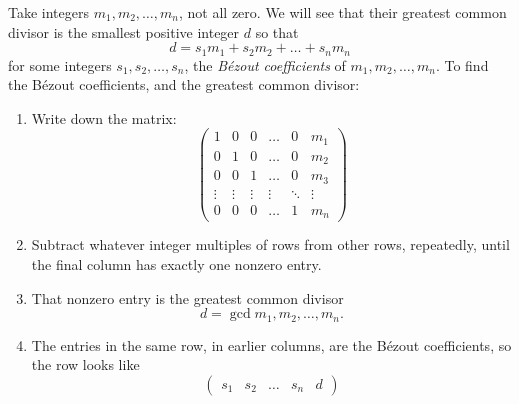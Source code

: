 Take integers \(m_1, m_2, \dots, m_n\), not all zero.
We will see that their greatest common divisor is the smallest positive integer \(d\) so that
\[
d = s_1 m_1 + s_2 m_2 + \dots + s_n m_n
\]
for some integers \(s_1, s_2, \dots, s_n\), the \emph{B\'ezout coefficients} of \(m_1, m_2, \dots, m_n\).
To find the B\'ezout coefficients, and the greatest common divisor:
\begin{enumerate}
\item
Write down the matrix:
\[
\begin{pmatrix}
1 & 0 & 0 & \dots & 0 & m_1 \\
0 & 1 & 0 & \dots & 0 & m_2 \\
0 & 0 & 1 & \dots & 0 & m_3 \\
\vdots & \vdots & \vdots & \vdots & \ddots & \vdots \\
0 & 0 & 0 & \dots & 1 & m_n
\end{pmatrix}
\]
\item
Subtract whatever integer multiples of rows from other rows, repeatedly, until the final column has exactly one nonzero entry.
\item
That nonzero entry is the greatest common divisor 
\[
d=\gcd{m_1, m_2, \dots, m_n}.
\]
\item
The entries in the same row, in earlier columns, are the B\'ezout coefficients, so the row looks like
\[
\begin{pmatrix}
s_1 & s_2 & \dots & s_n & d
\end{pmatrix}
\]
\end{enumerate}


